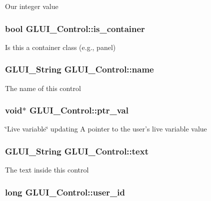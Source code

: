 Our integer value \hypertarget{class_g_l_u_i___control_ac667bec4efbc9bdbf3e246b4471fb4cb}{
\subsubsection[{is\+\_\+container}]{\setlength{\rightskip}{0pt plus 5cm}bool G\+L\+U\+I\+\_\+\+Control\+::is\+\_\+container}}\label{class_g_l_u_i___control_ac667bec4efbc9bdbf3e246b4471fb4cb}
Is this a container class (e.\+g., panel) \hypertarget{class_g_l_u_i___control_aa95b97d50df45335fc33f0af03958eb3}{
\subsubsection[{name}]{\setlength{\rightskip}{0pt plus 5cm}G\+L\+U\+I\+\_\+\+String G\+L\+U\+I\+\_\+\+Control\+::name}}\label{class_g_l_u_i___control_aa95b97d50df45335fc33f0af03958eb3}
The name of this control \hypertarget{class_g_l_u_i___control_a0890ea809b8d980695939e1d92a0af47}{
\subsubsection[{ptr\+\_\+val}]{\setlength{\rightskip}{0pt plus 5cm}void$\ast$ G\+L\+U\+I\+\_\+\+Control\+::ptr\+\_\+val}}\label{class_g_l_u_i___control_a0890ea809b8d980695939e1d92a0af47}
\char`\"{}\+Live variable\char`\"{} updating A pointer to the user's live variable value \hypertarget{class_g_l_u_i___control_af0d60e9736f4dbc34e9a536e75876d72}{
\subsubsection[{text}]{\setlength{\rightskip}{0pt plus 5cm}G\+L\+U\+I\+\_\+\+String G\+L\+U\+I\+\_\+\+Control\+::text}}\label{class_g_l_u_i___control_af0d60e9736f4dbc34e9a536e75876d72}
The text inside this control \hypertarget{class_g_l_u_i___control_a6c88b7c72b0800f88a5d4cda4868c8b6}{
\subsubsection[{user\+\_\+id}]{\setlength{\rightskip}{0pt plus 5cm}long G\+L\+U\+I\+\_\+\+Control\+::user\+\_\+id}}\label{class_g_l_u_i___control_a6c88b7c72b0800f88a5d4cda4868c8b6}


